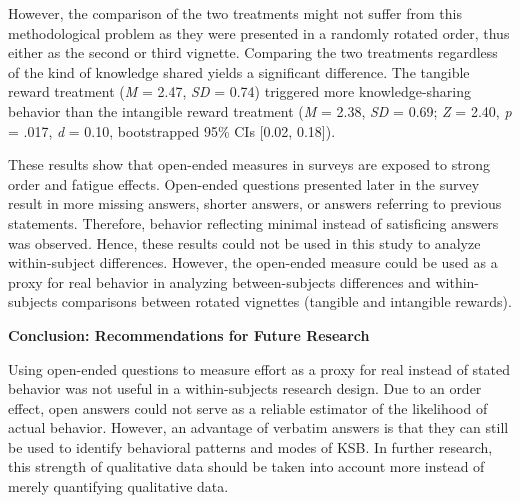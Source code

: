 \documentclass{article}
\begin{document}
However, the comparison of the two treatments might not suffer from this methodological problem as they were presented in a randomly rotated order, thus either as the second or third vignette. Comparing the two treatments regardless of the kind of knowledge shared yields a significant difference. The tangible reward treatment (\emph{M} = 2.47, \emph{SD} = 0.74) triggered more knowledge-sharing behavior than the intangible reward treatment (\emph{M} = 2.38, \emph{SD} = 0.69; \emph{Z} = 2.40, \emph{p} = .017, \emph{d} = 0.10, bootstrapped 95\% CIs [0.02, 0.18]).

These results show that open-ended measures in surveys are exposed to strong order and fatigue effects. Open-ended questions presented later in the survey result in more missing answers, shorter answers, or answers referring to previous statements. Therefore, behavior reflecting minimal instead of satisficing answers was observed. Hence, these results could not be used in this study to analyze within-subject differences. However, the open-ended measure could be used as a proxy for real behavior in analyzing between-subjects differences and within-subjects comparisons between rotated vignettes (tangible and intangible rewards).

\textbf{}

\textbf{Conclusion: Recommendations for Future Research}

Using open-ended questions to measure effort as a proxy for real instead of stated behavior was not useful in a within-subjects research design. Due to an order effect, open answers could not serve as a reliable estimator of the likelihood of actual behavior. However, an advantage of verbatim answers is that they can still be used to identify behavioral patterns and modes of KSB. In further research, this strength of qualitative data should be taken into account more instead of merely quantifying qualitative data.
\end{document}
